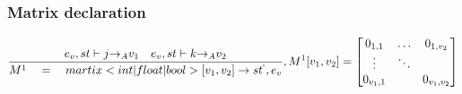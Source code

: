 \subsubsection{Matrix declaration}
\begin{equation}
	\frac { { e }_{ v },st\vdash j{ \rightarrow  }_{ A }{ v }_{ 1 }\quad { e }_{ v },st\vdash k{ \rightarrow  }_{ A }{ v }_{ 2 } }{ { M }^{ 1 }\quad =\quad martix<int|float|bool>[{ v }_{ 1 },{ v }_{ 2 }]\rightarrow { st }^{ ` },{ e }_{ v } } ,{ M }^{ 1 }[{ v }_{ 1 },{ v }_{ 2 }]=\begin{bmatrix} { { 0 }_{ 1,1 } } & \dots  & { 0 }_{ { 1,{ v }_{ 2 } } } \\ \vdots  & \ddots  &  \\ { 0 }_{ { v }_{ 1 },1 } &  & { 0 }_{ { v }_{ 1 },{ v }_{ 2 } } \end{bmatrix}
\end{equation}

